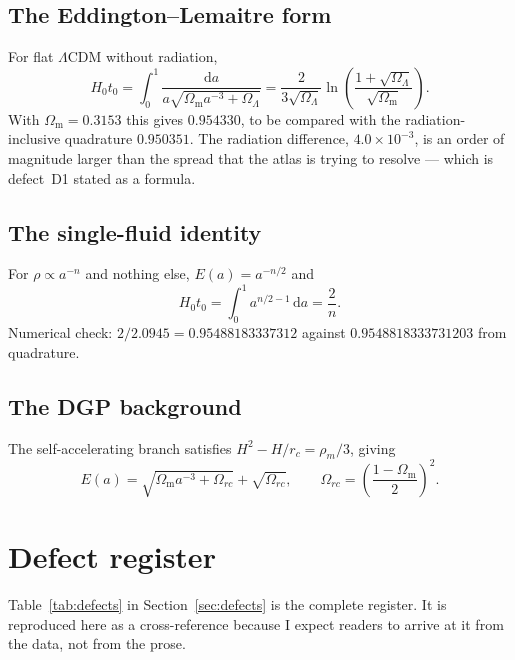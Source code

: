 \documentclass[11pt,a4paper]{article}
\theoremstyle{definition}
\newcommand{\Omm}{\Omega_{\mathrm{m}}}
\newcommand{\OmL}{\Omega_{\Lambda}}
\newcommand{\Hzt}{H_0 t_0}
\begin{document}
\subsection{The Eddington--Lemaitre form}

For flat $\Lambda$CDM without radiation,
\begin{equation}
\Hzt = \int_0^1 \frac{\mathrm{d}a}{a\sqrt{\Omm a^{-3} + \OmL}}
= \frac{2}{3\sqrt{\OmL}}\ln\left(\frac{1+\sqrt{\OmL}}{\sqrt{\Omm}}\right).
\end{equation}
With $\Omm = 0.3153$ this gives $0.954330$, to be compared with the
radiation-inclusive quadrature $0.950351$. The radiation difference,
$4.0\times10^{-3}$, is an order of magnitude larger than the spread that the
atlas is trying to resolve --- which is defect~D1 stated as a formula.

\subsection{The single-fluid identity}

For $\rho \propto a^{-n}$ and nothing else, $E(a) = a^{-n/2}$ and
\begin{equation}
\Hzt = \int_0^1 a^{n/2 - 1}\,\mathrm{d}a = \frac{2}{n}.
\end{equation}
Numerical check: $2/2.0945 = 0.95488183337312$ against
$0.9548818333731203$ from quadrature.

\subsection{The DGP background}

The self-accelerating branch satisfies $H^2 - H/r_c = \rho_m/3$, giving
\begin{equation}
E(a) = \sqrt{\Omm a^{-3} + \Omega_{rc}} + \sqrt{\Omega_{rc}},
\qquad \Omega_{rc} = \left(\frac{1-\Omm}{2}\right)^2 .
\end{equation}

\section{Defect register}
\label{app:defects}

Table~\ref{tab:defects} in Section~\ref{sec:defects} is the complete register.
It is reproduced here as a cross-reference because I expect readers to arrive
at it from the data, not from the prose.
\end{document}
